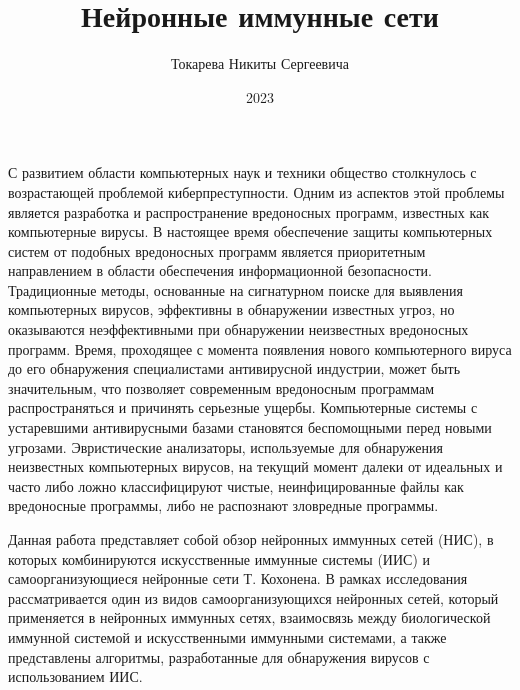\documentclass[bachelor, och, referat]{template}
\begin{document}
\title{Нейронные иммунные сети}





\author{Токарева Никиты Сергеевича}




\date{2023}

\maketitle



\tableofcontents

\intro
С развитием области компьютерных наук и техники общество столкнулось с 
возрастающей проблемой киберпреступности. Одним из аспектов этой проблемы 
является разработка и распространение вредоносных программ, известных как 
компьютерные вирусы. В настоящее время обеспечение защиты компьютерных 
систем от подобных вредоносных программ является приоритетным направлением 
в области обеспечения информационной безопасности. Традиционные методы, 
основанные на сигнатурном поиске для выявления компьютерных вирусов, 
эффективны в обнаружении известных угроз, но оказываются неэффективными 
при обнаружении неизвестных вредоносных программ. Время, проходящее с 
момента появления нового компьютерного вируса до его обнаружения 
специалистами антивирусной индустрии, может быть значительным, 
что позволяет современным вредоносным программам распространяться 
и причинять серьезные ущербы. Компьютерные системы с устаревшими 
антивирусными базами становятся беспомощными перед новыми угрозами. 
Эвристические анализаторы, используемые для обнаружения неизвестных 
компьютерных вирусов, на текущий момент далеки от идеальных и часто 
либо ложно классифицируют чистые, неинфицированные файлы как вредоносные 
программы, либо не распознают зловредные программы.

Данная работа представляет собой обзор нейронных иммунных сетей (НИС), в 
которых комбинируются искусственные иммунные системы (ИИС) и самоорганизующиеся 
нейронные сети Т. Кохонена. В рамках исследования рассматривается один из видов самоорганизующихся
нейронных сетей, который применяется в нейронных иммунных сетях, взаимосвязь между биологической 
иммунной системой и искусственными иммунными системами, а также представлены 
алгоритмы, разработанные для обнаружения вирусов с использованием ИИС.
\end{document}
